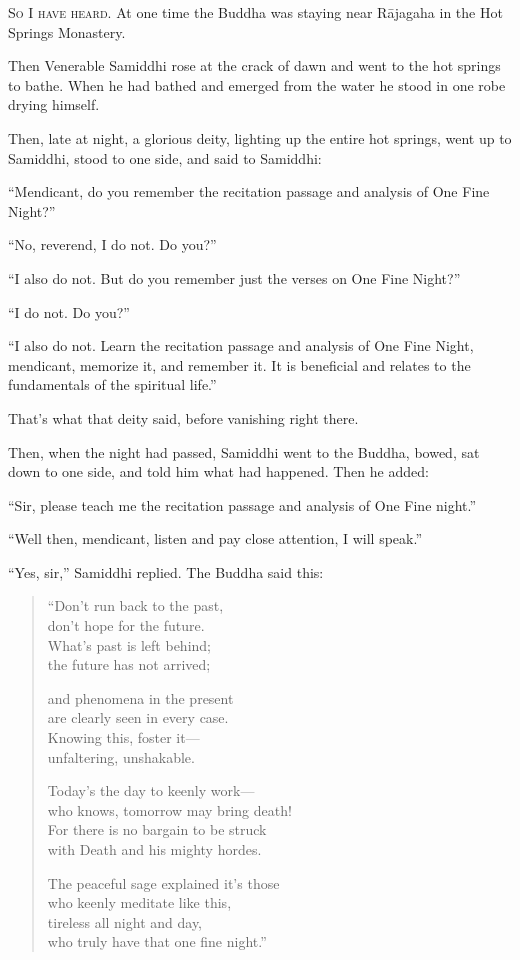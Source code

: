 \documentclass[12pt,openany]{book}%
\newcommand*{\scevam}[1]{\textsc{#1}}
\begin{document}
\scevam{So I have heard. }At one time the Buddha was staying near \textsanskrit{Rājagaha} in the Hot Springs Monastery. 

Then Venerable Samiddhi rose at the crack of dawn and went to the hot springs to bathe. When he had bathed and emerged from the water he stood in one robe drying himself. 

Then, late at night, a glorious deity, lighting up the entire hot springs, went up to Samiddhi, stood to one side, and said to Samiddhi: 

“Mendicant, do you remember the recitation passage and analysis of One Fine Night?” 

“No, reverend, I do not. Do you?” 

“I also do not. But do you remember just the verses on One Fine Night?” 

“I do not. Do you?” 

“I also do not. Learn the recitation passage and analysis of One Fine Night, mendicant, memorize it, and remember it. It is beneficial and relates to the fundamentals of the spiritual life.” 

That’s what that deity said, before vanishing right there. 

Then, when the night had passed, Samiddhi went to the Buddha, bowed, sat down to one side, and told him what had happened. Then he added: 

“Sir, please teach me the recitation passage and analysis of One Fine night.” 

“Well then, mendicant, listen and pay close attention, I will speak.” 

“Yes, sir,” Samiddhi replied. The Buddha said this: 

\begin{verse}%
“Don’t run back to the past, \\
don’t hope for the future. \\
What’s past is left behind; \\
the future has not arrived; 

and phenomena in the present \\
are clearly seen in every case. \\
Knowing this, foster it—\\
unfaltering, unshakable. 

Today’s the day to keenly work—\\
who knows, tomorrow may bring death! \\
For there is no bargain to be struck \\
with Death and his mighty hordes. 

The peaceful sage explained it’s those \\
who keenly meditate like this, \\
tireless all night and day, \\
who truly have that one fine night.” 

%
\end{verse}
\end{document}
